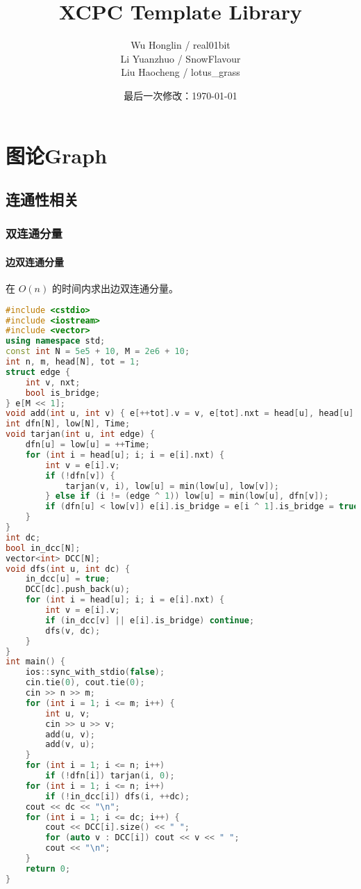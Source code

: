 \documentclass[9pt, a4paper, oneside]{book}
\title{\Huge XCPC Template Library}
\author{
    Wu Honglin / real01bit \\
    Li Yuanzhuo / SnowFlavour \\
    Liu Haocheng / lotus\_grass \\
}
\date{最后一次修改：\today}
\begin{document}
\maketitle
\tableofcontents
\chapter{图论Graph}
\section{连通性相关}
\subsection{双连通分量}
\subsubsection{边双连通分量}
在 $O(n)$ 的时间内求出边双连通分量。
\begin{lstlisting}[language={C++}]
#include <cstdio>
#include <iostream>
#include <vector>
using namespace std;
const int N = 5e5 + 10, M = 2e6 + 10;
int n, m, head[N], tot = 1;
struct edge {
    int v, nxt;
    bool is_bridge;
} e[M << 1];
void add(int u, int v) { e[++tot].v = v, e[tot].nxt = head[u], head[u] = tot; }
int dfn[N], low[N], Time;
void tarjan(int u, int edge) {
    dfn[u] = low[u] = ++Time;
    for (int i = head[u]; i; i = e[i].nxt) {
        int v = e[i].v;
        if (!dfn[v]) {
            tarjan(v, i), low[u] = min(low[u], low[v]);
        } else if (i != (edge ^ 1)) low[u] = min(low[u], dfn[v]);
        if (dfn[u] < low[v]) e[i].is_bridge = e[i ^ 1].is_bridge = true;
    }
}
int dc;
bool in_dcc[N];
vector<int> DCC[N];
void dfs(int u, int dc) {
    in_dcc[u] = true;
    DCC[dc].push_back(u);
    for (int i = head[u]; i; i = e[i].nxt) {
        int v = e[i].v;
        if (in_dcc[v] || e[i].is_bridge) continue;
        dfs(v, dc);
    }
}
int main() {
    ios::sync_with_stdio(false);
    cin.tie(0), cout.tie(0);
    cin >> n >> m;
    for (int i = 1; i <= m; i++) {
        int u, v;
        cin >> u >> v;
        add(u, v);
        add(v, u);
    }
    for (int i = 1; i <= n; i++)
        if (!dfn[i]) tarjan(i, 0);
    for (int i = 1; i <= n; i++)
        if (!in_dcc[i]) dfs(i, ++dc);
    cout << dc << "\n";
    for (int i = 1; i <= dc; i++) {
        cout << DCC[i].size() << " ";
        for (auto v : DCC[i]) cout << v << " ";
        cout << "\n";
    }
    return 0;
}\end{lstlisting}
\end{document}
